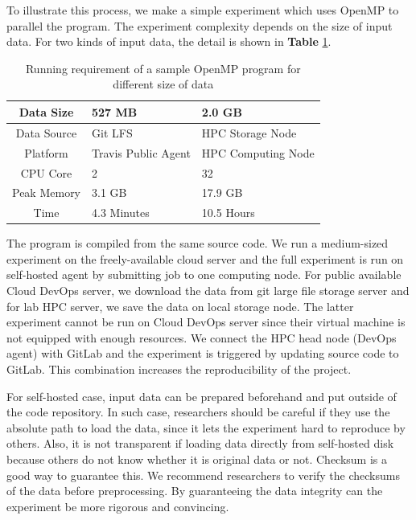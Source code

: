 \documentclass{IEEEcsmag}
\begin{document}
To illustrate this process, we make a simple experiment which uses OpenMP to parallel the program. The experiment complexity depends on the size of input data. For two kinds of input data, the detail is shown in {\bf Table} \ref{tab:time}.
\begin{table}
\centering
\begin{tabular}{|c|p{1.5cm}|p{1.5cm}|}
\hline
Data Size & 527 MB & 2.0 GB\\
\hline
Data Source & Git LFS & HPC Storage Node \\
\hline
Platform & Travis Public Agent & HPC Computing Node  \\
\hline
CPU Core & 2 & 32  \\ 
\hline
Peak Memory  & 3.1 GB  & 17.9 GB\\ 
\hline
Time & 4.3 Minutes & 10.5 Hours \\
\hline
\end{tabular}
\caption{Running requirement of a sample OpenMP program for different size of data}\label{tab:time}
\end{table}

The program is compiled from the same source code. We run a medium-sized experiment on the freely-available cloud server and the full experiment is run on self-hosted agent by submitting job to one computing node. For public available Cloud DevOps server, we download the data from git large file storage server and for lab HPC server, we save the data on local storage node. The latter experiment cannot be run on Cloud DevOps server since their virtual machine is not equipped with enough resources. We connect the HPC head node (DevOps agent) with GitLab and the experiment is triggered by updating source code to GitLab.
This combination increases the reproducibility of the project.

For self-hosted case, input data can be prepared beforehand and put outside of the code repository. In such case, researchers should be careful if they use the absolute path to load the data, since it lets the experiment hard to reproduce by others. Also, it is not transparent if loading data directly from self-hosted disk because others do not know whether it is original data or not. Checksum is a good way to guarantee this. We recommend researchers to verify the checksums of the data before preprocessing. By guaranteeing the data integrity can the experiment be more rigorous and convincing.

\end{document}
